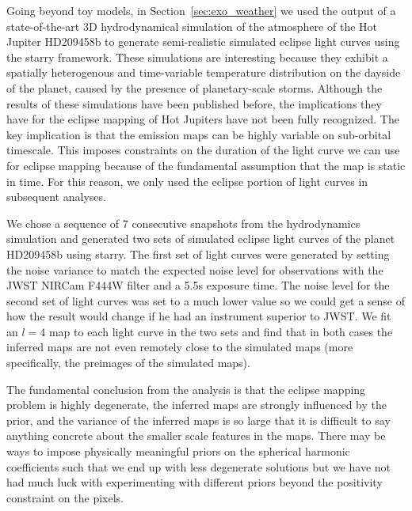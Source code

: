 \documentclass[12pt,dvipsnames]{report}
\newcommand{\ssf}[1]{\textsf{#1}}
\begin{document}
Going beyond toy models, in Section~\ref{sec:exo_weather} we used the output of a state-of-the-art 
3D hydrodynamical simulation of the atmosphere of the Hot Jupiter HD209458b to generate
semi-realistic simulated eclipse light curves using the \ssf{starry} framework. 
These simulations are interesting 
because they exhibit a spatially heterogenous and time-variable temperature distribution 
on the dayside of the planet, caused by the presence of planetary-scale storms. Although 
the results of these simulations have been published before, the implications they have 
for the eclipse mapping of Hot Jupiters have not been fully recognized. The key implication 
is that the emission maps can be highly variable on sub-orbital 
timescale. This imposes constraints on the duration of the light curve we can use for 
eclipse mapping because of the fundamental assumption that the map is static in time. 
For this reason, we only used the eclipse portion of light curves in subsequent analyses.

We chose a sequence of 7 consecutive snapshots from the hydrodynamics simulation and generated two sets
of simulated eclipse light curves of the planet HD209458b using \ssf{starry}. 
The first set of light curves were generated by setting the noise variance to match the expected 
noise level for observations with the JWST NIRCam F444W filter and a 5.5s exposure time.
The noise level for the second set of light curves was set to a much lower value so we could 
get a sense of how the result would change if he had an instrument superior to JWST.
We fit an $l=4$ map to each light curve in the two sets and find
that in both cases the inferred maps are not even remotely close to the simulated maps 
(more specifically, the preimages of the simulated maps). 


The fundamental conclusion from the analysis is that the eclipse mapping
problem is highly degenerate, the inferred maps are strongly influenced by the prior, and
the variance of the inferred maps is so large that it is difficult to say 
anything concrete about the smaller scale features in the maps.
There may be ways to impose physically meaningful priors on the 
spherical harmonic coefficients such that we end up with less degenerate solutions but we have not 
had much luck with experimenting with different priors beyond the positivity constraint on the 
pixels. %
\end{document}
